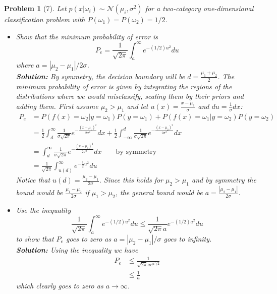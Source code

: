 \documentclass[11pt]{article}
\theoremstyle{quest}
\newtheorem*{question}{Problem}
\begin{document}
\pagebreak
\begin{question}[7]
Let $p(x|\omega_i)  \sim \mathcal{N}(\mu_i,\sigma^2)$ for a two-category one-dimensional classification problem with $P(\omega_1)=P(\omega_2)=1/2$.
\begin{itemize}
\item[(a)] Show that the minimum probability of error is
\begin{equation*}
P_e=\frac{1}{\sqrt{2\pi}}\int_{a}^{\infty} e^{-(1/2)u^{2}}du
\end{equation*}
where $a=|\mu_2 - \mu_1|/2\sigma$.\\
\textbf{Solution:}
By symmetry, the decision boundary will be $d=\frac{\mu_1+\mu_2}2$. The minimum probability of error is given by integrating the regions of the distributions where we would misclassify, scaling them by their priors and adding them. First assume $\mu_2>\mu_1$ and let $u(x)=\frac{x-\mu_1}{\sigma}$ and $du=\frac1{\sigma}dx$: \begin{align*}
P_e &= P(f(x)=\omega_2|y=\omega_1)P(y=\omega_1)+P(f(x)=\omega_1|y=\omega_2)P(y=\omega_2)\\
&= \frac12\int_d^{\infty}\frac1{\sigma\sqrt{2\pi}}e^{-\frac{(x-\mu_1)^2}{2\sigma^2}}dx + \frac12\int_{-\infty}^d\frac1{\sigma\sqrt{2\pi}}e^{-\frac{(x-\mu_2)^2}{2\sigma^2}}dx\\
&= \int_d^{\infty}\frac1{\sigma\sqrt{2\pi}}e^{-\frac{(x-\mu_1)^2}{2\sigma^2}}dx \qquad \text{by symmetry}\\
&= \frac1{\sqrt{2\pi}}\int_{u(d)}^{\infty}e^{-\frac12u^2}du
\end{align*}
Notice that $u(d)=\frac{\mu_2-\mu_1}{2\sigma}$. Since this holds for $\mu_2>\mu_1$ and by symmetry the bound would be $\frac{\mu_1-\mu_2}{2\sigma}$ if $\mu_1>\mu_2$, the general bound would be $a=\frac{|\mu_2-\mu_1|}{2\sigma}$. 
\vspace{0.5in}
\item[(b)] Use the inequality
\begin{equation*}
\frac{1}{\sqrt{2\pi}}\int_{a}^{\infty} e^{-(1/2)u^{2}}du \leq \frac{1}{\sqrt{2\pi}a}e^{-(1/2)a^{2}}du
\end{equation*}
to show that $P_e$ goes to zero as $a=|\mu_2 - \mu_1|/\sigma$ goes to infinity. \\
\textbf{Solution:}
Using the inequality we have \begin{align*}
P_e &\leq \frac1{\sqrt{2\pi}ae^{a^2/2}}\\
&\leq \frac1a
\end{align*}
which clearly goes to zero as $a\rightarrow\infty$.
\end{itemize}
\end{question}
\newpage
\end{document}
